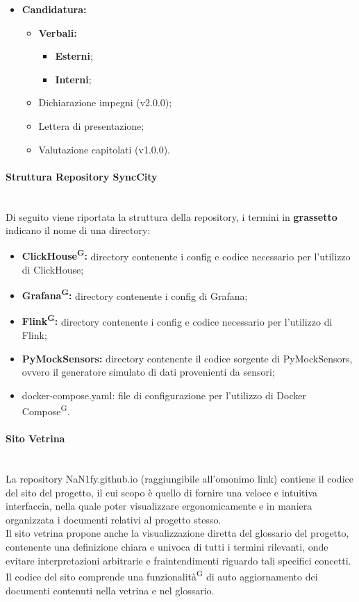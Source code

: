\documentclass[8pt]{article}
\newcommand{\glossterm}[1]{#1\textsuperscript{G}} %
\newcommand{\subsubsubsection}[1]{\paragraph{#1}\mbox{}\\}
\begin{document}
\begin{itemize}
    \item \textbf{Candidatura:}
    \begin{itemize}
        \item \textbf{Verbali:}
        \begin{itemize}
            \item \textbf{Esterni};
            \item \textbf{Interni};
        \end{itemize}
        \item Dichiarazione impegni (v2.0.0);
        \item Lettera di presentazione;
        \item Valutazione capitolati (v1.0.0).
    \end{itemize}
 \end{itemize}

\subsubsubsection{Struttura Repository SyncCity}
Di seguito viene riportata la struttura della repository, i termini in \textbf{grassetto} indicano il nome di una directory:
\begin{itemize}
    \item \textbf{\glossterm{ClickHouse}:} directory contenente i config e codice necessario per l'utilizzo di ClickHouse;
    \item \textbf{\glossterm{Grafana}:} directory contenente i config di Grafana;
    \item \textbf{\glossterm{Flink}:} directory contenente i config e codice necessario per l'utilizzo di Flink;
    \item \textbf{PyMockSensors:} directory contenente il codice sorgente di PyMockSensors, ovvero il generatore simulato di dati provenienti da sensori;
    \item docker-compose.yaml: file di configurazione per l'utilizzo di \glossterm{Docker Compose}.
\end{itemize}

\subsubsubsection{Sito Vetrina}
La repository NaN1fy.github.io (raggiungibile all'omonimo link) contiene il codice del sito del progetto, il cui scopo è quello di fornire una veloce e intuitiva interfaccia, nella quale poter visualizzare ergonomicamente e in maniera organizzata i documenti relativi al progetto stesso. \\
Il sito vetrina propone anche la visualizzazione diretta del glossario del progetto, contenente una definizione chiara e univoca di tutti i termini rilevanti, onde evitare interpretazioni arbitrarie e fraintendimenti riguardo tali specifici concetti. \\
Il codice del sito comprende una \glossterm{funzionalità} di auto aggiornamento dei documenti contenuti nella vetrina e nel glossario.
\end{document}
